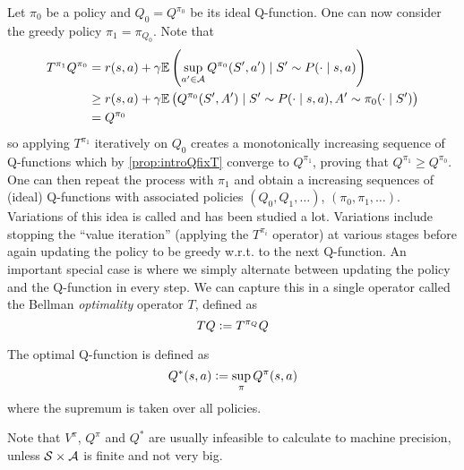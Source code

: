 \documentclass{article}
\begin{document}
Let $\pi_0$ be a policy and $Q_0 = Q^{\pi_0}$ be its ideal Q-function.
One can now consider the greedy policy $\pi_1 = \pi_{Q_0}$.
Note that
\begin{align}
  T^{\pi_1} Q^{\pi_0} = & \; r(s, a) + \gamma \mathbb{E} \left(
    \sup_{a' \in \mathcal{A}} Q^{\pi_0}(S', a') \mid S' \sim P(\cdot \mid s, a) 
  \right)
  \\ \geq & \; r(s, a) + \gamma \mathbb{E} \left(
    Q^{\pi_0}(S', A') \mid S' \sim P(\cdot \mid s, a), A' \sim \pi_0(\cdot \mid S')
  \right)
  \\ = & \; Q^{\pi_0} \label{eq:introTlem1}
\end{align}
so applying $T^{\pi_1}$ iteratively on $Q_0$ creates a 
monotonically increasing sequence of Q-functions
which by \cref{prop:introQfixT} converge to $Q^{\pi_1}$,
proving that $Q^{\pi_1} \geq Q^{\pi_0}$.
One can then repeat the process with $\pi_1$ and
obtain a increasing sequences of (ideal) Q-functions with associated policies
$(Q_0,Q_1, \dots)$, $(\pi_0, \pi_1, \dots)$.
Variations of this idea is called 
and has been studied a lot.
Variations include stopping the ``value iteration''
(applying the $T^{\pi_i}$ operator) at various stages before again updating
the policy to be greedy w.r.t. to the next Q-function.
An important special case is where we simply alternate between updating
the policy and the Q-function in every step.
We can capture this in a single operator called the
Bellman \emph{optimality} operator $T$, defined as
\[ T Q \vcentcolon= T^{\pi_Q} Q \]

The optimal Q-function is defined as
\[ Q^*(s, a) \vcentcolon= \sup_\pi Q^\pi(s, a) \]
where the supremum is taken over all policies.



Note that $V^\pi$, $Q^\pi$ and $Q^*$ are usually infeasible to calculate to
machine precision, unless $\mathcal{S} \times \mathcal{A}$ is finite and not very big.
\end{document}
